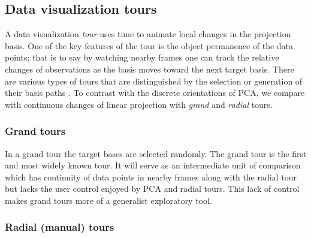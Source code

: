 \documentclass{template/monashthesis}
\begin{document}
\hypertarget{data-visualization-tours}{%
\subsection{Data visualization tours}\label{data-visualization-tours}}

A data visualization \emph{tour} uses time to animate local changes in the projection basis. One of the key features of the tour is the object permanence of the data points; that is to say by watching nearby frames one can track the relative changes of observations as the basis moves toward the next target basis. There are various types of tours that are distinguished by the selection or generation of their basis paths \autocite{lee_review_2021,cook_grand_2008}. To contrast with the discrete orientations of PCA, we compare with continuous changes of linear projection with \emph{grand} and \emph{radial} tours.

\hypertarget{grand-tours}{%
\subsubsection{Grand tours}\label{grand-tours}}

In a grand tour \autocite{asimov_grand_1985} the target bases are selected randomly. The grand tour is the first and most widely known tour. It will serve as an intermediate unit of comparison which has continuity of data points in nearby frames along with the radial tour but lacks the user control enjoyed by PCA and radial tours. This lack of control makes grand tours more of a generalist exploratory tool.

\hypertarget{radial-manual-tours}{%
\subsubsection{Radial (manual) tours}\label{radial-manual-tours}}
\end{document}
